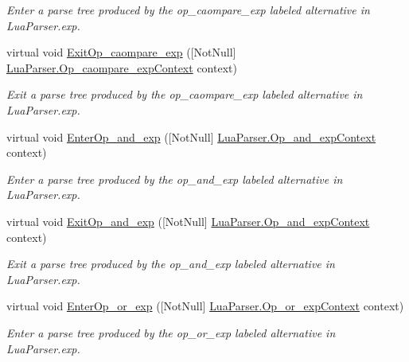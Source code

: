 \begin{DoxyCompactItemize}
\begin{DoxyCompactList}\small\item\em Enter a parse tree produced by the {\ttfamily op\+\_\+caompare\+\_\+exp} labeled alternative in Lua\+Parser.\+exp. \end{DoxyCompactList}\item 
virtual void \mbox{\hyperlink{classzlua_1_1_lua_base_listener_a0969ff285a2df8e85f1c63245d167077}{Exit\+Op\+\_\+caompare\+\_\+exp}} (\mbox{[}Not\+Null\mbox{]} \mbox{\hyperlink{classzlua_1_1_lua_parser_1_1_op__caompare__exp_context}{Lua\+Parser.\+Op\+\_\+caompare\+\_\+exp\+Context}} context)
\begin{DoxyCompactList}\small\item\em Exit a parse tree produced by the {\ttfamily op\+\_\+caompare\+\_\+exp} labeled alternative in Lua\+Parser.\+exp. \end{DoxyCompactList}\item 
virtual void \mbox{\hyperlink{classzlua_1_1_lua_base_listener_ace41c3066a31697b1bda64251528030b}{Enter\+Op\+\_\+and\+\_\+exp}} (\mbox{[}Not\+Null\mbox{]} \mbox{\hyperlink{classzlua_1_1_lua_parser_1_1_op__and__exp_context}{Lua\+Parser.\+Op\+\_\+and\+\_\+exp\+Context}} context)
\begin{DoxyCompactList}\small\item\em Enter a parse tree produced by the {\ttfamily op\+\_\+and\+\_\+exp} labeled alternative in Lua\+Parser.\+exp. \end{DoxyCompactList}\item 
virtual void \mbox{\hyperlink{classzlua_1_1_lua_base_listener_aceb367c135e67ca2d8c8372e57a4a2cb}{Exit\+Op\+\_\+and\+\_\+exp}} (\mbox{[}Not\+Null\mbox{]} \mbox{\hyperlink{classzlua_1_1_lua_parser_1_1_op__and__exp_context}{Lua\+Parser.\+Op\+\_\+and\+\_\+exp\+Context}} context)
\begin{DoxyCompactList}\small\item\em Exit a parse tree produced by the {\ttfamily op\+\_\+and\+\_\+exp} labeled alternative in Lua\+Parser.\+exp. \end{DoxyCompactList}\item 
virtual void \mbox{\hyperlink{classzlua_1_1_lua_base_listener_ad05798f5b17c22a225fe160a5230d82c}{Enter\+Op\+\_\+or\+\_\+exp}} (\mbox{[}Not\+Null\mbox{]} \mbox{\hyperlink{classzlua_1_1_lua_parser_1_1_op__or__exp_context}{Lua\+Parser.\+Op\+\_\+or\+\_\+exp\+Context}} context)
\begin{DoxyCompactList}\small\item\em Enter a parse tree produced by the {\ttfamily op\+\_\+or\+\_\+exp} labeled alternative in Lua\+Parser.\+exp. \end{DoxyCompactList}\item 

\end{DoxyCompactItemize}
